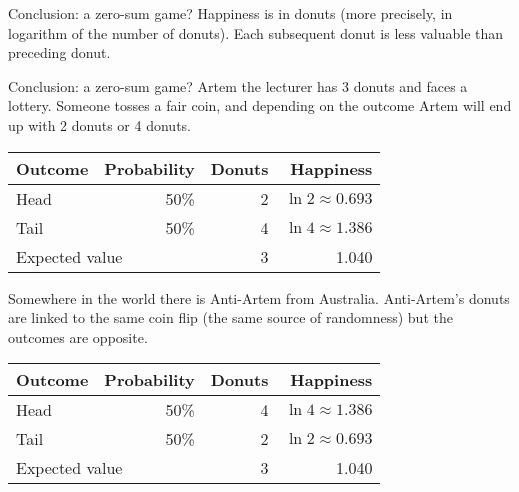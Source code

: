 \documentclass{beamer}
\begin{document}
\begin{frame}{Conclusion: a zero-sum game?}
\justify
Happiness is in donuts (more precisely, in logarithm of the number of donuts). Each subsequent donut is less valuable than preceding donut. 

\justify
\centering
{}
\end{frame}



\begin{frame}{Conclusion: a zero-sum game?}
\justify
Artem the lecturer has 3 donuts and faces a lottery. Someone tosses a fair coin, and depending on the outcome Artem will end up with 2 donuts or 4 donuts.

\justify
\centering
\begin{tabular}{l|r|r|r}
Outcome & Probability & Donuts & Happiness \\ \hline
Head & 50\% & 2 & $\ln 2 \approx 0.693$ \\
Tail & 50\% & 4 & $\ln 4 \approx 1.386$ \\ \hline
\multicolumn{2}{l|}{Expected value} & 3 & 1.040
\end{tabular}

\justify
Somewhere in the world there is Anti-Artem from Australia. Anti-Artem's donuts are linked to the same coin flip (the same source of randomness) but the outcomes are opposite.

\justify
\centering
\begin{tabular}{l|r|r|r}
Outcome & Probability & Donuts & Happiness \\ \hline
Head & 50\% & 4 & $\ln 4 \approx 1.386$ \\ 
Tail & 50\% & 2 & $\ln 2 \approx 0.693$ \\ \hline
\multicolumn{2}{l|}{Expected value} & 3 & 1.040
\end{tabular}
\end{frame}
\end{document}
